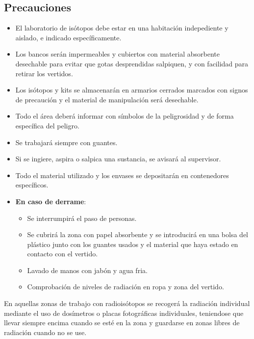 \subsection{Precauciones}
\begin{itemize}[itemsep=0pt,parsep=0pt,topsep=0pt,partopsep=0pt]
    \item El laboratorio de isótopos debe estar en una habitación indepediente y aislado, e indicado específicamente.
    \item Los bancos serán impermeables y cubiertos con material absorbente desechable para evitar que gotas desprendidas salpiquen, y con facilidad para retirar los vertidos.
    \item Los isótopos y kits se almacenarán en armarios cerrados marcados con signos de precaución y el material de manipulación será desechable.
    \item Todo el área deberá informar con símbolos de la peligrosidad y de forma específica del peligro.
    \item Se trabajará siempre con guantes.
    \item Si se ingiere, aspira o salpica una sustancia, se avisará al supervisor.
    \item Todo el material utilizado y los envases se depositarán en contenedores específicos.
    \item \textbf{En caso de derrame}:
    \begin{itemize}[itemsep=0pt,parsep=0pt,topsep=0pt,partopsep=0pt]
        \item Se interrumpirá el paso de personas.
        \item Se cubrirá la zona con papel absorbente y se introducirá en una bolsa del plástico junto con los guantes usados y el material que haya estado en contacto con el vertido.
        \item Lavado de manos con jabón y agua fria.
        \item Comprobación de niveles de radiación en ropa y zona del vertido.
    \end{itemize}
\end{itemize}

En aquellas zonas de trabajo con radioisótopos se recogerá la radiación individual mediante el uso de dosímetros o placas fotográficas individuales, teniendose que llevar siempre encima cuando se esté en la zona y guardarse en zonas libres de radiación cuando no se use.


